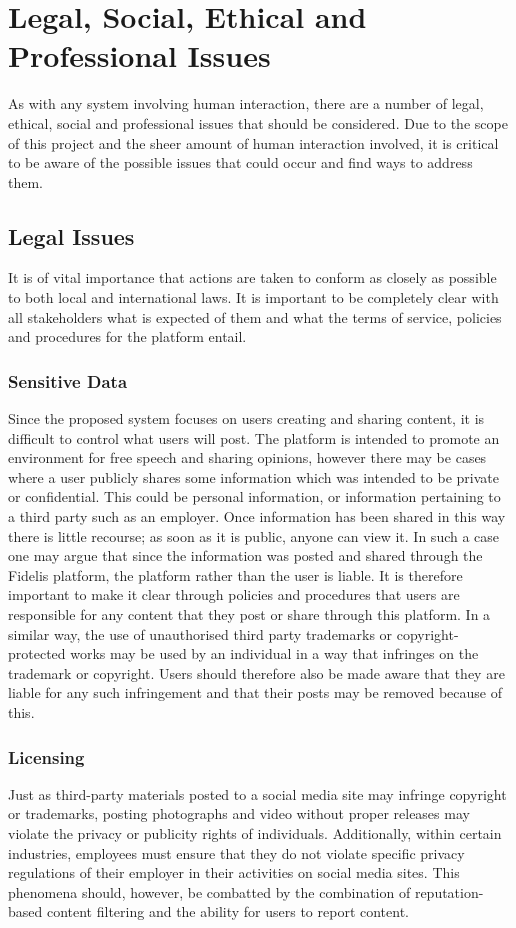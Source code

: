 \chapter{Legal, Social, Ethical and Professional Issues}
\label{Chapter:Issues}
As with any system involving human interaction, there are a number of legal, ethical, social and professional issues that should be considered. Due to the scope of this project and the sheer amount of human interaction involved, it is critical to be aware of the possible issues that could occur and find ways to address them.

\section{Legal Issues}
It is of vital importance that actions are taken to conform as closely as possible to both local and international laws. It is important to be completely clear with all stakeholders what is expected of them and what the terms of service, policies and procedures for the platform entail.

\subsection{Sensitive Data}
Since the proposed system focuses on users creating and sharing content, it is difficult to control what users will post. The platform is intended to promote an environment for free speech and sharing opinions, however there may be cases where a user publicly shares some information which was intended to be private or confidential. This could be personal information, or information pertaining to a third party such as an employer. Once information has been shared in this way there is little recourse; as soon as it is public, anyone can view it. In such a case one may argue that since the information was posted and shared through the Fidelis platform, the platform rather than the user is liable. It is therefore important to make it clear through policies and procedures that users are responsible for any content that they post or share through this platform. In a similar way, the use of unauthorised third party trademarks or copyright-protected works may be used by an individual in a way that infringes on the trademark or copyright. Users should therefore also be made aware that they are liable for any such infringement and that their posts may be removed because of this.

\subsection{Licensing}
Just as third-party materials posted to a social media site may infringe copyright or trademarks, posting photographs and video without proper releases may violate the privacy or publicity rights of individuals. Additionally, within certain industries, employees must ensure that they do not violate specific privacy regulations of their employer in their activities on social media sites. This phenomena should, however, be combatted by the combination of reputation-based content filtering and the ability for users to report content.

